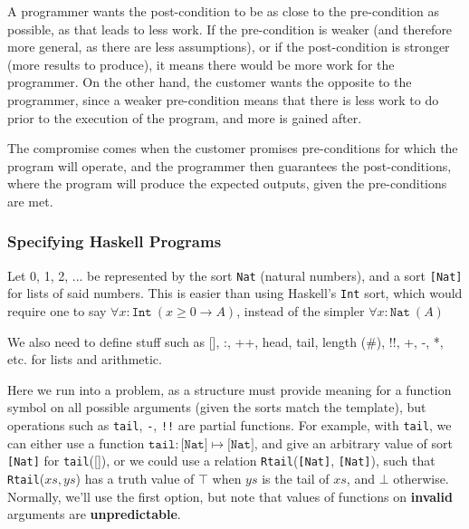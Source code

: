 \documentclass[a4paper, 12pt]{article}
\begin{document}
            A programmer wants the post-condition to be as close to the pre-condition as possible, as that leads to less work. If the pre-condition is weaker (and therefore more general, as there are less assumptions), or if the post-condition is stronger (more results to produce), it means there would be more work for the programmer. On the other hand, the customer wants the opposite to the programmer, since a weaker pre-condition means that there is less work to do prior to the execution of the program, and more is gained after.
            \medskip

            The compromise comes when the customer promises pre-conditions for which the program will operate, and the programmer then guarantees the post-conditions, where the program will produce the expected outputs, given the pre-conditions are met.
            \subsubsection*{Specifying Haskell Programs}
                Let 0, 1, 2, ... be represented by the sort \texttt{Nat} (natural numbers), and a sort \texttt{[Nat]} for lists of said numbers. This is easier than using Haskell's \texttt{Int} sort, which would require one to say $\forall x : \texttt{Int}\ (x \geq 0 \rightarrow A)$, instead of the simpler $\forall x : \texttt{Nat}\ (A)$
                \medskip

                We also need to define stuff such as [], :, ++, head, tail, length (\#), !!, +, -, *, etc. for lists and arithmetic.
                \smallskip

                Here we run into a problem, as a structure must provide meaning for a function symbol on all possible arguments (given the sorts match the template), but operations such as \texttt{tail}, \texttt{-}, \texttt{!!} are partial functions. For example, with \texttt{tail}, we can either use a function $\texttt{tail}: \texttt{[Nat]} \mapsto \texttt{[Nat]}$, and give an arbitrary value of sort \texttt{[Nat]} for \texttt{tail}([]), or we could use a relation \texttt{Rtail}(\texttt{[Nat]}, \texttt{[Nat]}), such that \texttt{Rtail}($xs, ys$) has a truth value of $\top$ when $ys$ is the tail of $xs$, and $\bot$ otherwise. Normally, we'll use the first option, but note that values of functions on \textbf{invalid} arguments are \textbf{unpredictable}.
\end{document}
